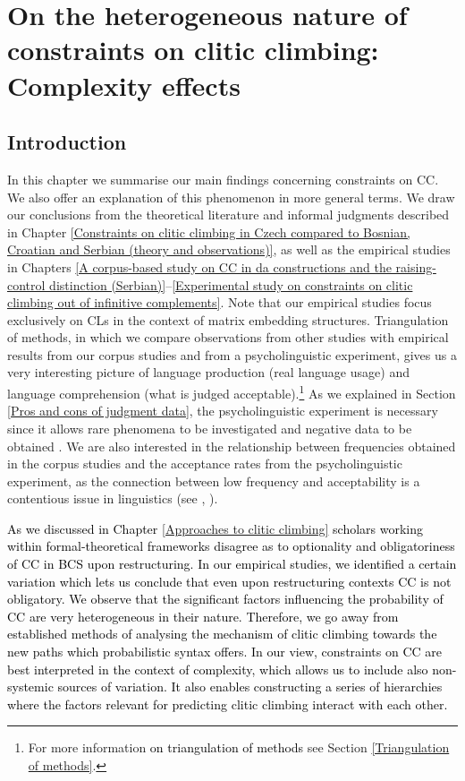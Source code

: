 \chapter[On the heterogeneous nature of constraints on clitic climbing]
        {On the heterogeneous nature of constraints on clitic climbing: Complexity effects}
\label{On the heterogeneous nature of constraints on clitic climbing: complexity effects}
\section{Introduction}

In this chapter we summarise our main findings concerning constraints on CC. We also offer an explanation of this phenomenon in more general terms. We draw our conclusions from the theoretical literature and informal judgments described in Chapter \ref{Constraints on clitic climbing in Czech compared to Bosnian, Croatian and Serbian (theory and observations)}, as well as the empirical studies in Chapters \ref{A corpus-based study on CC in da constructions and the raising-control distinction (Serbian)}--\ref{Experimental study on constraints on clitic climbing out of infinitive complements}. Note that our empirical studies focus exclusively on CLs in the context of matrix embedding structures. Triangulation of methods, in which we compare observations from other studies with empirical results from our corpus studies and from a psycholinguistic experiment, gives us a very interesting picture of language production (real language usage) and language comprehension (what is judged acceptable).\footnote{For more information \textcolor{black}{on triangulation of methods} see Section \ref{Triangulation of methods}.} As we explained in  Section \ref{Pros and cons of judgment data}, the psycholinguistic experiment is necessary since it allows rare phenomena to be investigated and negative data to be obtained \citep[cf.][100]{Hoffmann13}. We are also interested in the relationship between frequencies obtained in the corpus studies and the acceptance rates from the psycholinguistic experiment, as the connection between low frequency and acceptability is a contentious issue in linguistics (see \citealt{BermelKnittl12}, \citealt{Divjak17}).

 \textcolor{black}{As we discussed in Chapter \ref{Approaches to clitic climbing} scholars working within formal-theoretical frameworks disagree as to optionality \citep[][]{Progovac93, Progovac96, CavarWilder94, Stjepanovic04} and obligatoriness \citep{Aljovic05} of CC in BCS upon restructuring. In our empirical studies, we identified a certain variation which lets us conclude that even upon restructuring contexts CC is not obligatory. We observe that the significant factors influencing the probability of CC are very heterogeneous in their nature. Therefore, we go away from established methods of analysing the mechanism of clitic climbing towards the new paths which probabilistic syntax \citep{Manning02} offers. In our view, constraints on CC are best interpreted in the context of complexity, which allows us to include also non-systemic sources of variation. It also enables constructing a series of hierarchies where the factors relevant for predicting clitic climbing interact with each other.}


